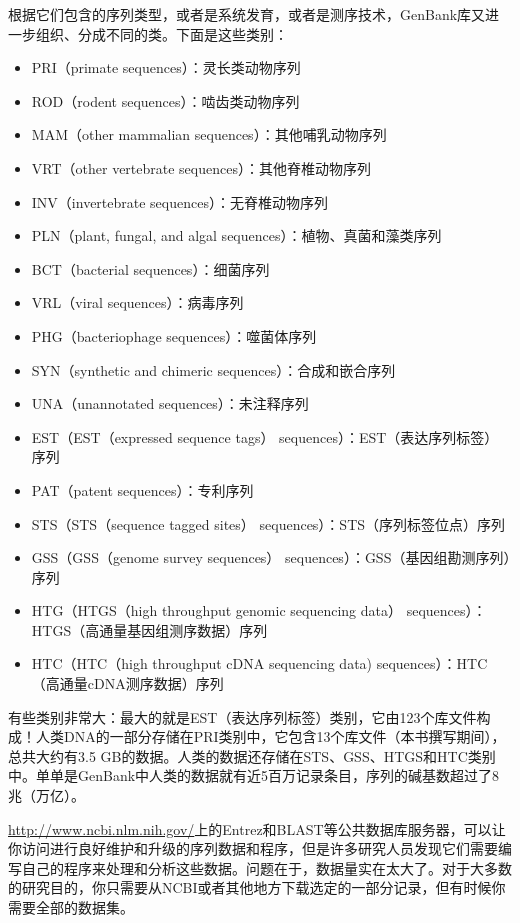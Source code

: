 根据它们包含的序列类型，或者是系统发育，或者是测序技术，GenBank库又进一步组织、分成不同的类。下面是这些类别：

\begin{itemize}
  \item PRI（primate sequences）：灵长类动物序列
  \item ROD（rodent sequences）：啮齿类动物序列
  \item MAM（other mammalian sequences）：其他哺乳动物序列
  \item VRT（other vertebrate sequences）：其他脊椎动物序列
  \item INV（invertebrate sequences）：无脊椎动物序列
  \item PLN（plant, fungal, and algal sequences）：植物、真菌和藻类序列
  \item BCT（bacterial sequences）：细菌序列
  \item VRL（viral sequences）：病毒序列
  \item PHG（bacteriophage sequences）：噬菌体序列
  \item SYN（synthetic and chimeric sequences）：合成和嵌合序列
  \item UNA（unannotated sequences）：未注释序列
  \item EST（EST（expressed sequence tags） sequences）：EST（表达序列标签）序列
  \item PAT（patent sequences）：专利序列
  \item STS（STS（sequence tagged sites） sequences）：STS（序列标签位点）序列
  \item GSS（GSS（genome survey sequences） sequences）：GSS（基因组勘测序列）序列
  \item HTG（HTGS（high throughput genomic sequencing data） sequences）：HTGS（高通量基因组测序数据）序列
  \item HTC（HTC（high throughput cDNA sequencing data) sequences）：HTC（高通量cDNA测序数据）序列
\end{itemize}

有些类别非常大：最大的就是EST（表达序列标签）类别，它由123个库文件构成！人类DNA的一部分存储在PRI类别中，它包含13个库文件（本书撰写期间），总共大约有3.5 GB的数据。人类的数据还存储在STS、GSS、HTGS和HTC类别中。单单是GenBank中人类的数据就有近5百万记录条目，序列的碱基数超过了8兆（万亿）。

\href{http://www.ncbi.nlm.nih.gov/}{http://www.ncbi.nlm.nih.gov/}上的Entrez和BLAST等公共数据库服务器，可以让你访问进行良好维护和升级的序列数据和程序，但是许多研究人员发现它们需要编写自己的程序来处理和分析这些数据。问题在于，数据量实在太大了。对于大多数的研究目的，你只需要从NCBI或者其他地方下载选定的一部分记录，但有时候你需要全部的数据集。

